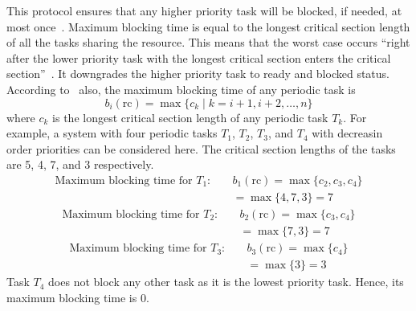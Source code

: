 This protocol ensures that any higher priority task will be blocked, if needed, at most once~\cite{JiacunWang.2017}. Maximum blocking time is equal to the longest critical section length of all the tasks sharing the resource. This means that the worst case occurs ``right after the lower priority task with the longest critical section enters the critical section''~\cite{JiacunWang.2017}. It downgrades the higher priority task to ready and blocked status. According to~\cite{JiacunWang.2017} also, the maximum blocking time of any periodic task is\\
\[
    b_i(\mathrm{rc}) = \max \{ c_k \mid k = i + 1, i + 2, \ldots, n \}
\]
where $c_k$ is the longest critical section length of any periodic task $T_k$. For example, a system with four periodic tasks $T_1$, $T_2$, $T_3$, and $T_4$ with decreasin order priorities can be considered here. The critical section lengths of the tasks are 5, 4, 7, and 3 respectively.\\
\begin{align*}
\text{Maximum blocking time for } T_1: \quad 
& b_1(\mathrm{rc}) = \max \{ c_2, c_3, c_4 \} \\
& = \max \{ 4, 7, 3 \} = 7
\end{align*}
\begin{align*}
\text{Maximum blocking time for } T_2: \quad 
& b_2(\mathrm{rc}) = \max \{ c_3, c_4 \} \\
& = \max \{ 7, 3 \} = 7
\end{align*}
\begin{align*}
\text{Maximum blocking time for } T_3: \quad 
& b_3(\mathrm{rc}) = \max \{ c_4 \} \\
& = \max \{ 3 \} = 3
\end{align*}
Task $T_4$ does not block any other task as it is the lowest priority task. Hence, its maximum blocking time is 0.

